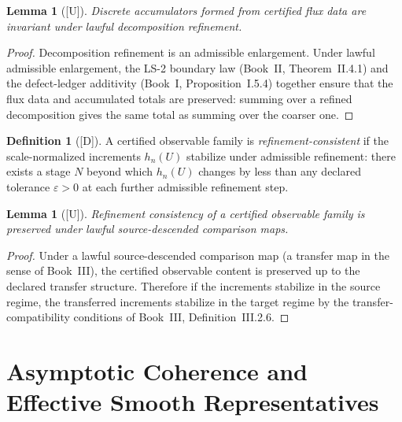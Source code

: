 \documentclass[12pt,oneside]{amsbook}
\theoremstyle{plain}
\newtheorem{lemma}[theorem]{Lemma}
\theoremstyle{definition}
\newtheorem{definition}[theorem]{Definition}
\theoremstyle{remark}
\newcommand{\status}[1]{\textup{[#1]}}
\begin{document}
\begin{lemma}[\status{U}]\label{lem:accumulator-inv}
Discrete accumulators formed from certified flux data are invariant
under lawful decomposition refinement.
\end{lemma}

\begin{proof}
Decomposition refinement is an admissible enlargement.  Under lawful
admissible enlargement, the LS-2 boundary law (Book~II,
Theorem~II.4.1) and the defect-ledger additivity (Book~I,
Proposition~I.5.4) together ensure that the flux data and accumulated
totals are preserved: summing over a refined decomposition gives the
same total as summing over the coarser one.
\end{proof}

\begin{definition}[\status{D}]\label{def:refinement-consistent}
A certified observable family is \emph{refinement-consistent} if the
scale-normalized increments $h_n(U)$ stabilize under admissible
refinement: there exists a stage $N$ beyond which $h_n(U)$ changes by
less than any declared tolerance $\varepsilon > 0$ at each further
admissible refinement step.
\end{definition}

\begin{lemma}[\status{U}]\label{lem:refinement-consistent-stable}
Refinement consistency of a certified observable family is preserved
under lawful source-descended comparison maps.
\end{lemma}

\begin{proof}
Under a lawful source-descended comparison map (a transfer map in the
sense of Book~III), the certified observable content is preserved up to
the declared transfer structure.  Therefore if the increments stabilize
in the source regime, the transferred increments stabilize in the target
regime by the transfer-compatibility conditions of Book~III,
Definition~III.2.6.
\end{proof}

\section{Asymptotic Coherence and Effective Smooth Representatives}
\end{document}
